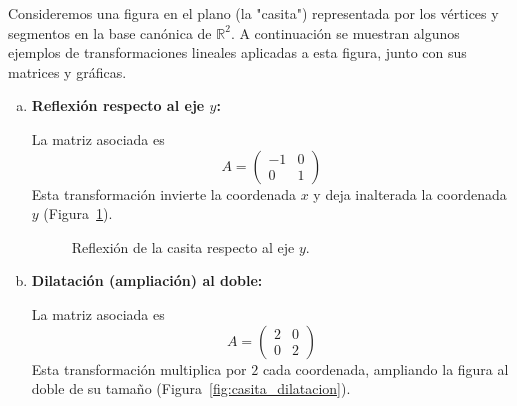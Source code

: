 \begin{example}
Consideremos una figura en el plano (la "casita") representada por los vértices y segmentos en la base canónica de $\mathbb{R}^2$. A continuación se muestran algunos ejemplos de transformaciones lineales aplicadas a esta figura, junto con sus matrices y gráficas.

\begin{enumerate}[(a)]
    \item \textbf{Reflexión respecto al eje $y$:}

    La matriz asociada es
    \[
    A = \begin{pmatrix} -1 & 0 \\ 0 & 1 \end{pmatrix}
    \]
    Esta transformación invierte la coordenada $x$ y deja inalterada la coordenada $y$ (Figura~\ref{fig:casita_reflexion_y}).

    \begin{figure}[!htbp]\centering
    \caption{Reflexión de la casita respecto al eje $y$.}\label{fig:casita_reflexion_y}
    \end{figure}

    \item \textbf{Dilatación (ampliación) al doble:}

    La matriz asociada es
    \[
    A = \begin{pmatrix} 2 & 0 \\ 0 & 2 \end{pmatrix}
    \]
    Esta transformación multiplica por $2$ cada coordenada, ampliando la figura al doble de su tamaño (Figura~\ref{fig:casita_dilatacion}).


\end{enumerate}
\end{example}
